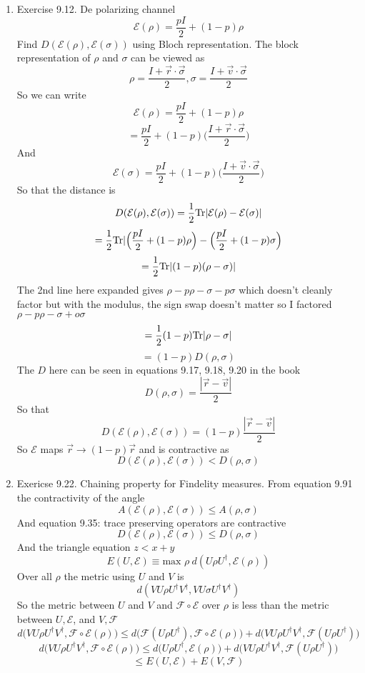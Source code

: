 \documentclass[12pt]{article}
\newcommand{\Tr}{{\rm Tr}}
\begin{document}
\begin{enumerate}
    \item Exercise 9.12. De polarizing channel 
    $$ \mathcal{E} (\rho) = \frac{pI}{2} + (1-p)\rho $$
    Find $D(\mathcal{E} (\rho), \mathcal{E} (\sigma))$ using Bloch representation. The block representation of $\rho$ and $\sigma$ can be viewed as 
    $$ \rho = \frac{I + \vec{r} \cdot \vec{\sigma}}{2}, \sigma = \frac{I + \vec{v} \cdot \vec{\sigma}}{2} $$
    So we can write 
    $$ \mathcal{E} (\rho) = \frac{pI}{2} + (1-p) \rho $$
    $$ = \frac{pI}{2} + (1-p) \Big( \frac{I+ \vec{r} \cdot \vec{\sigma}}{2} \Big) $$
    And 
    $$ \mathcal{E} (\sigma) = \frac{pI}{2} + (1-p) \Big( \frac{I+ \vec{v} \cdot \vec{\sigma}}{2} \Big) $$
    So that the distance is 
    $$ D( \mathcal{E} (\rho), \mathcal{E} (\sigma) ) = \frac{1}{2} \Tr | \mathcal{E} (\rho) - \mathcal{E} (\sigma) | $$
    $$ = \frac{1}{2} \Tr | \Big( \frac{pI}{2} + (1-p)\rho \Big) - \Big( \frac{pI}{2} + (1-p) \sigma \Big) $$
    $$ = \frac{1}{2} \Tr | (1-p) (\rho -\sigma) | $$
    The 2nd line here expanded gives $\rho - p \rho - \sigma - p \sigma$ which doesn't cleanly factor but with the modulus, the sign swap doesn't matter so I factored $\rho - p \rho - \sigma + o \sigma $
    $$ = \frac{1}{2} (1-p) \Tr | \rho - \sigma | $$
    $$ = (1-p) D (\rho, \sigma) $$
    The $D$ here can be seen in equations 9.17, 9.18, 9.20 in the book 
    $$ D(\rho, \sigma) = \frac{|\vec{r} - \vec{v} |}{2} $$
    So that 
    $$ D( \mathcal{E} (\rho), \mathcal{E} (\sigma) ) = (1-p) \frac{|\vec{r} - \vec{v} |}{2} $$ 
    So $\mathcal{E}$ maps $\vec{r} \to (1-p) \vec{r}$ and is contractive as 
    $$ D( \mathcal{E} (\rho), \mathcal{E} (\sigma) ) < D (\rho, \sigma) $$

    \item Exericse 9.22. Chaining property for Findelity measures. From equation 9.91 the contractivity of the angle 
    $$ A(\mathcal{E} (\rho), \mathcal{E} (\sigma) ) \leq A (\rho, \sigma) $$
    And equation 9.35: trace preserving operators are contractive 
    $$ D (\mathcal{E} (\rho), \mathcal{E} (\sigma) ) \leq D (\rho, \sigma) $$
    And the triangle equation $z < x+y$ 
    $$ E(U, \mathcal{E} ) \equiv \textrm{max $\rho$} \ d(U \rho U^{\dagger}, \mathcal{E}(\rho) ) $$
    Over all $\rho$ the metric using $U$ and $V$ is 
    $$ d(VU \rho U^{\dagger} V^{\dagger}, VU \sigma U^{\dagger} V^{\dagger} ) $$
    So the metric between $U$ and $V$ and $\mathcal{F} \circ \mathcal{E}$ over $\rho$ is less than the metric between $U, \mathcal{E}$, and $V, \mathcal{F}$
    $$ d \big(VU \rho U^{\dagger} V^{\dagger}, \mathcal{F} \circ \mathcal{E} (\rho) \big) \leq d \big(\mathcal{F} (U \rho U^{\dagger}), \mathcal{F} \circ \mathcal{E} (\rho) \big) + d \big(VU \rho U^{\dagger} V^{\dagger}, \mathcal{F} (U \rho U^{\dagger} )\big)  $$
    $$ d \big(VU \rho U^{\dagger} V^{\dagger}, \mathcal{F} \circ \mathcal{E} (\rho) \big) \leq d \big( U \rho U^{\dagger}, \mathcal{E} (\rho) \big) + d \big( VU \rho U^{\dagger} V^{\dagger},  \mathcal{F} (U \rho U^{\dagger} ) \big) $$ 
    $$ \leq E(U, \mathcal{E} ) + E(V, \mathcal{F} ) $$


\end{enumerate}
\end{document}
